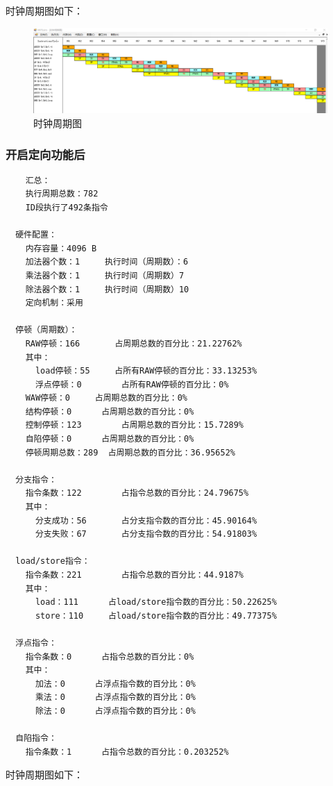 \documentclass[blue,normal,cn]{elegantnote}
\begin{document}
时钟周期图如下：

\begin{figure}[H]
    \centering
    \includegraphics[width=.8\textwidth]{fig/naive_bubble.png}
    \caption{时钟周期图}
    \label{fig:naive_prod}
\end{figure}

\subsubsection{开启定向功能后}

\begin{lstlisting}
    汇总：
    执行周期总数：782
    ID段执行了492条指令

  硬件配置：
    内存容量：4096 B
    加法器个数：1		执行时间（周期数）：6
    乘法器个数：1		执行时间（周期数）7		
    除法器个数：1		执行时间（周期数）10		
    定向机制：采用

  停顿（周期数）：
    RAW停顿：166		占周期总数的百分比：21.22762%
    其中：
      load停顿：55		占所有RAW停顿的百分比：33.13253%
      浮点停顿：0		占所有RAW停顿的百分比：0%
    WAW停顿：0		占周期总数的百分比：0%
    结构停顿：0		占周期总数的百分比：0%
    控制停顿：123		占周期总数的百分比：15.7289%
    自陷停顿：0		占周期总数的百分比：0%
    停顿周期总数：289	占周期总数的百分比：36.95652%

  分支指令：
    指令条数：122		占指令总数的百分比：24.79675%
    其中：
      分支成功：56		占分支指令数的百分比：45.90164%
      分支失败：67		占分支指令数的百分比：54.91803%

  load/store指令：
    指令条数：221		占指令总数的百分比：44.9187%
    其中：
      load：111		占load/store指令数的百分比：50.22625%
      store：110		占load/store指令数的百分比：49.77375%

  浮点指令：
    指令条数：0		占指令总数的百分比：0%
    其中：
      加法：0		占浮点指令数的百分比：0%
      乘法：0		占浮点指令数的百分比：0%
      除法：0		占浮点指令数的百分比：0%

  自陷指令：
    指令条数：1		占指令总数的百分比：0.203252%
\end{lstlisting}

时钟周期图如下：
\end{document}
